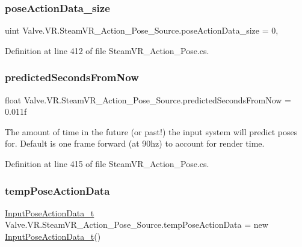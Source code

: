 \subsubsection{\texorpdfstring{poseActionData\_size}{poseActionData\_size}}
{\footnotesize\ttfamily uint Valve.\+V\+R.\+Steam\+V\+R\+\_\+\+Action\+\_\+\+Pose\+\_\+\+Source.\+pose\+Action\+Data\+\_\+size = 0\hspace{0.3cm}{\ttfamily [static]}, {\ttfamily [protected]}}



Definition at line 412 of file Steam\+V\+R\+\_\+\+Action\+\_\+\+Pose.\+cs.

\mbox{\label{class_valve_1_1_v_r_1_1_steam_v_r___action___pose___source_ac19b14e1ae06d27a39a614cfa444bea8}} 
\subsubsection{\texorpdfstring{predictedSecondsFromNow}{predictedSecondsFromNow}}
{\footnotesize\ttfamily float Valve.\+V\+R.\+Steam\+V\+R\+\_\+\+Action\+\_\+\+Pose\+\_\+\+Source.\+predicted\+Seconds\+From\+Now = 0.\+011f}



The amount of time in the future (or past!) the input system will predict poses for. Default is one frame forward (at 90hz) to account for render time. 



Definition at line 415 of file Steam\+V\+R\+\_\+\+Action\+\_\+\+Pose.\+cs.

\mbox{\label{class_valve_1_1_v_r_1_1_steam_v_r___action___pose___source_ac5b188566e843e649476bad50e8d2185}} 
\subsubsection{\texorpdfstring{tempPoseActionData}{tempPoseActionData}}
{\footnotesize\ttfamily \mbox{\hyperlink{struct_valve_1_1_v_r_1_1_input_pose_action_data__t}{Input\+Pose\+Action\+Data\+\_\+t}} Valve.\+V\+R.\+Steam\+V\+R\+\_\+\+Action\+\_\+\+Pose\+\_\+\+Source.\+temp\+Pose\+Action\+Data = new \mbox{\hyperlink{struct_valve_1_1_v_r_1_1_input_pose_action_data__t}{Input\+Pose\+Action\+Data\+\_\+t}}()\hspace{0.3cm}{\ttfamily [protected]}}



